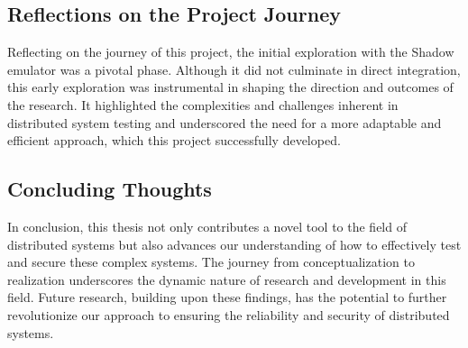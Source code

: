 \documentclass[a4paper,11pt,oneside]{report}
\begin{document}
\subsection{Reflections on the Project Journey}
Reflecting on the journey of this project, the initial exploration with the Shadow emulator was a pivotal phase. Although it did not culminate in direct integration, this early exploration was instrumental in shaping the direction and outcomes of the research. It highlighted the complexities and challenges inherent in distributed system testing and underscored the need for a more adaptable and efficient approach, which this project successfully developed.

\subsection{Concluding Thoughts}
In conclusion, this thesis not only contributes a novel tool to the field of distributed systems but also advances our understanding of how to effectively test and secure these complex systems. The journey from conceptualization to realization underscores the dynamic nature of research and development in this field. Future research, building upon these findings, has the potential to further revolutionize our approach to ensuring the reliability and security of distributed systems.


\cleardoublepage
{}
{}
\printbibliography

%
%
\end{document}
